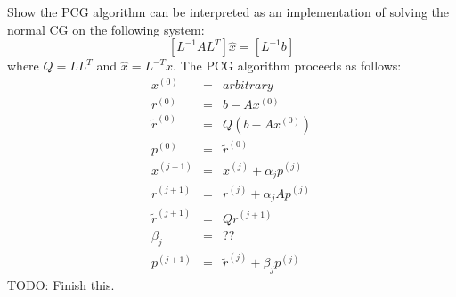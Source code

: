 \documentclass{article}
\newcommand{\ea}[1]{\begin{eqnarray*}#1\end{eqnarray*}}
\newcommand{\inv}[1]{#1^{-1}}
\begin{document}
 Show the PCG algorithm can be interpreted as an implementation of
solving the normal CG on the following system:
\[
\left[\inv{L} AL^T \right]\hat{x} = \left[\inv{L}b\right]
\]
where $Q=LL^T$ and $\hat{x}=L^{-T}x$.
 The PCG algorithm proceeds as follows:
\ea{
x^{(0)} &=& \textit{arbitrary} \\
r^{(0)} &=& b - Ax^{(0)} \\
\tilde{r}^{(0)} &=& Q\left( b-Ax^{(0)} \right) \\
p^{(0)} &=& \tilde{r}^{(0)} \\
x^{(j+1)} &=& x^{(j)} + \alpha_j p^{(j)} \\
r^{(j+1)} &=& r^{(j)} + \alpha_j Ap^{(j)} \\
\tilde{r}^{(j+1)} &=& Qr^{(j+1)} \\
\beta_j &=& ?? \\
p^{(j+1)} &=& \tilde{r}^{(j)} + \beta_jp^{(j)}
}
TODO: Finish this.
\end{document}
